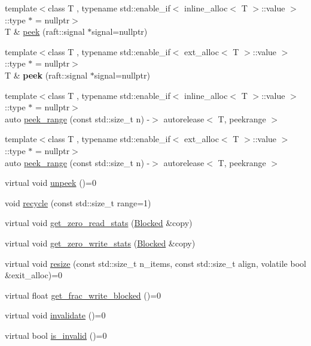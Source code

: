 \begin{DoxyCompactItemize}
\item 
{\footnotesize template$<$class T , typename std\+::enable\+\_\+if$<$ inline\+\_\+alloc$<$ T $>$\+::value $>$\+::type $\ast$  = nullptr$>$ }\\T \& \hyperlink{class_f_i_f_o_a8721e94d35fdfb20294ae8478d0baae5}{peek} (raft\+::signal $\ast$signal=nullptr)
\item 
\hypertarget{class_f_i_f_o_a8721e94d35fdfb20294ae8478d0baae5}{}\label{class_f_i_f_o_a8721e94d35fdfb20294ae8478d0baae5} 
{\footnotesize template$<$class T , typename std\+::enable\+\_\+if$<$ ext\+\_\+alloc$<$ T $>$\+::value $>$\+::type $\ast$  = nullptr$>$ }\\T \& {\bfseries peek} (raft\+::signal $\ast$signal=nullptr)
\item 
{\footnotesize template$<$class T , typename std\+::enable\+\_\+if$<$ inline\+\_\+alloc$<$ T $>$\+::value $>$\+::type $\ast$  = nullptr$>$ }\\auto \hyperlink{class_f_i_f_o_ada716e83c59345f73295d3b6f720681f}{peek\+\_\+range} (const std\+::size\+\_\+t n) -\/$>$ autorelease$<$ T, peekrange $>$
\item 
{\footnotesize template$<$class T , typename std\+::enable\+\_\+if$<$ ext\+\_\+alloc$<$ T $>$\+::value $>$\+::type $\ast$  = nullptr$>$ }\\auto \hyperlink{class_f_i_f_o_ada716e83c59345f73295d3b6f720681f}{peek\+\_\+range} (const std\+::size\+\_\+t n) -\/$>$ autorelease$<$ T, peekrange $>$
\item 
virtual void \hyperlink{class_f_i_f_o_aa0cbb6c4a5b8783af38c6deb1a6f651e}{unpeek} ()=0
\item 
void \hyperlink{class_f_i_f_o_abac84fe2d1e4b83df8571a97abf9a713}{recycle} (const std\+::size\+\_\+t range=1)
\item 
virtual void \hyperlink{class_f_i_f_o_aa372ba61179c80ce8355aadbdbbad844}{get\+\_\+zero\+\_\+read\+\_\+stats} (\hyperlink{struct_blocked}{Blocked} \&copy)
\item 
virtual void \hyperlink{class_f_i_f_o_a6dd419cc4b99bd13f6b018145844bdd2}{get\+\_\+zero\+\_\+write\+\_\+stats} (\hyperlink{struct_blocked}{Blocked} \&copy)
\item 
virtual void \hyperlink{class_f_i_f_o_a27264d14b86811604a54e0d30aa22c33}{resize} (const std\+::size\+\_\+t n\+\_\+items, const std\+::size\+\_\+t align, volatile bool \&exit\+\_\+alloc)=0
\item 
virtual float \hyperlink{class_f_i_f_o_a4d44784c43a4026508e85982eb3174c7}{get\+\_\+frac\+\_\+write\+\_\+blocked} ()=0
\item 
virtual void \hyperlink{class_f_i_f_o_af65e8231c0d1a7cdf250f2ce57f3723f}{invalidate} ()=0
\item 
virtual bool \hyperlink{class_f_i_f_o_a01bc45169bff5253496dc6bf6f902f89}{is\+\_\+invalid} ()=0
\end{DoxyCompactItemize}
